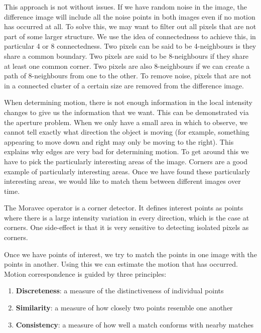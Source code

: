 \documentclass{article}
\begin{document}
	This approach is not without issues. If we have random noise in the image, the difference image will include all the noise points in both images even if no motion has occurred at all. To solve this, we may want to filter out all pixels that are not part of some larger structure. We use the idea of connectedness to achieve this, in particular 4 or 8 connectedness. Two pixels can be said to be 4-neighbours is they share a common boundary. Two pixels are said to be 8-neighbours if they share at least one common corner. Two pixels are also 8-neighbours if we can create a path of 8-neighbours from one to the other. To remove noise, pixels that are not in a connected cluster of a certain size are removed from the difference image.
	
	\par 
	When determining motion, there is not enough information in the local intensity changes to give us the information that we want. This can be demonstrated via the aperture problem. When we only have a small area in which to observe, we cannot tell exactly what direction the object is moving (for example, something appearing to move down and right may only be moving to the right). This explains why edges are very bad for determining motion. To get around this we have to pick the particularly interesting areas of the image. Corners are a good example of particularly interesting areas. Once we have found these particularly interesting areas, we would like to match them between different images over time.
	
	\par 
	The Moravec operator is a corner detector. It defines interest points as points where there is a large intensity variation in every direction, which is the case at corners. One side-effect is that it is very sensitive to detecting isolated pixels as corners.
	
	\par 
	Once we have points of interest, we try to match the points in one image with the points in another. Using this we can estimate the motion that has occurred. Motion correspondence is guided by three principles:
	\begin{enumerate}
		\item \textbf{Discreteness}: a measure of the distinctiveness of individual points
		\item \textbf{Similarity}: a measure of how closely two points resemble one another
		\item \textbf{Consistency}: a measure of how well a match conforms with nearby matches
	\end{enumerate}
	
\end{document}
